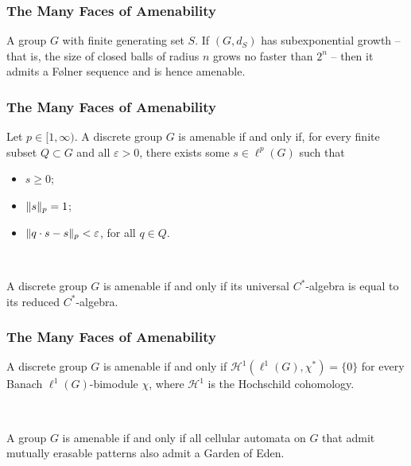 \documentclass{beamer}
\DeclarePairedDelimiter{\norm}{\lVert}{\rVert}
\begin{document}
\begin{frame}
\frametitle{The Many Faces of Amenability}
\begin{corollary}
A group $G$ with finite generating set $S$. If $(G, d_S)$ has subexponential growth -- that is, the size of closed balls of radius $n$ grows no faster than $2^n$ -- then it admits a F{\o}lner sequence and is hence amenable.
\end{corollary}
\end{frame}

\begin{frame}
\frametitle{The Many Faces of Amenability}
\begin{theorem}
Let $p \in [1, \infty)$. A discrete group $G$ is amenable if and only if, for every finite subset $Q \subset G$ and all $\varepsilon > 0$, there exists some $s \in \ell^p(G)$ such that
\begin{itemize}
\item $s \geq 0$;
\item $\norm{s}_p = 1$;
\item $\norm{q \cdot s - s}_p < \varepsilon$, for all $q \in Q$.
\end{itemize}
\end{theorem}
\noindent\\[0.5\baselineskip]
\begin{theorem}
A discrete group $G$ is amenable if and only if its universal $C^*$-algebra is equal to its reduced $C^*$-algebra.
\end{theorem}
\end{frame}

\begin{frame}
\frametitle{The Many Faces of Amenability}
\begin{theorem}[Johnson, 1972]
A discrete group $G$ is amenable if and only if $\mathcal{H}^1(\ell^1(G), \chi^*) = \{0\}$ for every Banach $\ell^1(G)$-bimodule $\chi$, where $\mathcal{H}^1$ is the Hochschild cohomology.
\end{theorem}
\noindent\\[0.5\baselineskip]
\begin{theorem}[Bartholdi, 2010]
A group $G$ is amenable if and only if all cellular automata on $G$ that admit mutually erasable patterns also admit a Garden of Eden.
\end{theorem}
\end{frame}

\end{document}

